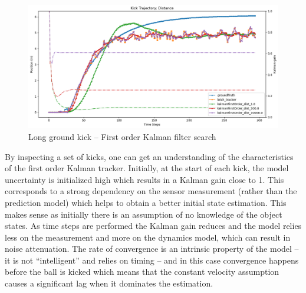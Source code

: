 \documentclass[a4paper,twoside,12pt]{report}
\begin{document}
\begin{figure}[h!]
\begin{center}
\includegraphics[width=12cm]{images/fok_ground_long.png}
\caption{Long ground kick -- First order Kalman filter search}
\label{fig:fokgroundlong}
\end{center}
\end{figure}



By inspecting a set of kicks, one can get an understanding of the characteristics of the first order Kalman tracker. Initially, at the start of each kick, the model uncertainty is initialized high which results in a Kalman gain close to 1. This corresponds to a strong dependency on the sensor measurement (rather than the prediction model) which helps to obtain a better initial state estimation. This makes sense as initially there is an assumption of no knowledge of the object states. As time steps are performed the Kalman gain reduces and the model relies less on the measurement and more on the dynamics model, which can result in noise attenuation. The rate of convergence is an intrinsic property of the model -- it is not ``intelligent'' and relies on timing -- and in this case convergence happens before the ball is kicked which means that the constant velocity assumption causes a significant lag when it dominates the estimation.
\end{document}
